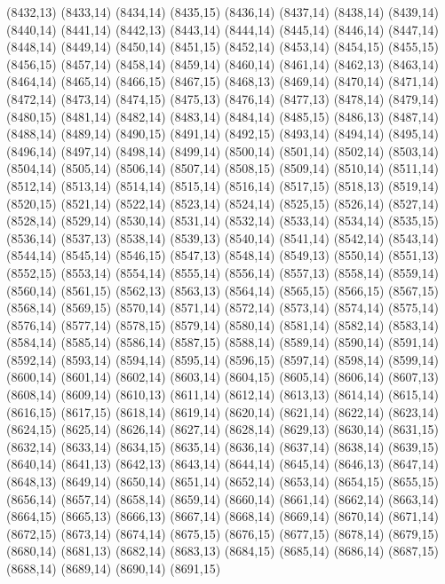 (8432,13)
(8433,14)
(8434,14)
(8435,15)
(8436,14)
(8437,14)
(8438,14)
(8439,14)
(8440,14)
(8441,14)
(8442,13)
(8443,14)
(8444,14)
(8445,14)
(8446,14)
(8447,14)
(8448,14)
(8449,14)
(8450,14)
(8451,15)
(8452,14)
(8453,14)
(8454,15)
(8455,15)
(8456,15)
(8457,14)
(8458,14)
(8459,14)
(8460,14)
(8461,14)
(8462,13)
(8463,14)
(8464,14)
(8465,14)
(8466,15)
(8467,15)
(8468,13)
(8469,14)
(8470,14)
(8471,14)
(8472,14)
(8473,14)
(8474,15)
(8475,13)
(8476,14)
(8477,13)
(8478,14)
(8479,14)
(8480,15)
(8481,14)
(8482,14)
(8483,14)
(8484,14)
(8485,15)
(8486,13)
(8487,14)
(8488,14)
(8489,14)
(8490,15)
(8491,14)
(8492,15)
(8493,14)
(8494,14)
(8495,14)
(8496,14)
(8497,14)
(8498,14)
(8499,14)
(8500,14)
(8501,14)
(8502,14)
(8503,14)
(8504,14)
(8505,14)
(8506,14)
(8507,14)
(8508,15)
(8509,14)
(8510,14)
(8511,14)
(8512,14)
(8513,14)
(8514,14)
(8515,14)
(8516,14)
(8517,15)
(8518,13)
(8519,14)
(8520,15)
(8521,14)
(8522,14)
(8523,14)
(8524,14)
(8525,15)
(8526,14)
(8527,14)
(8528,14)
(8529,14)
(8530,14)
(8531,14)
(8532,14)
(8533,14)
(8534,14)
(8535,15)
(8536,14)
(8537,13)
(8538,14)
(8539,13)
(8540,14)
(8541,14)
(8542,14)
(8543,14)
(8544,14)
(8545,14)
(8546,15)
(8547,13)
(8548,14)
(8549,13)
(8550,14)
(8551,13)
(8552,15)
(8553,14)
(8554,14)
(8555,14)
(8556,14)
(8557,13)
(8558,14)
(8559,14)
(8560,14)
(8561,15)
(8562,13)
(8563,13)
(8564,14)
(8565,15)
(8566,15)
(8567,15)
(8568,14)
(8569,15)
(8570,14)
(8571,14)
(8572,14)
(8573,14)
(8574,14)
(8575,14)
(8576,14)
(8577,14)
(8578,15)
(8579,14)
(8580,14)
(8581,14)
(8582,14)
(8583,14)
(8584,14)
(8585,14)
(8586,14)
(8587,15)
(8588,14)
(8589,14)
(8590,14)
(8591,14)
(8592,14)
(8593,14)
(8594,14)
(8595,14)
(8596,15)
(8597,14)
(8598,14)
(8599,14)
(8600,14)
(8601,14)
(8602,14)
(8603,14)
(8604,15)
(8605,14)
(8606,14)
(8607,13)
(8608,14)
(8609,14)
(8610,13)
(8611,14)
(8612,14)
(8613,13)
(8614,14)
(8615,14)
(8616,15)
(8617,15)
(8618,14)
(8619,14)
(8620,14)
(8621,14)
(8622,14)
(8623,14)
(8624,15)
(8625,14)
(8626,14)
(8627,14)
(8628,14)
(8629,13)
(8630,14)
(8631,15)
(8632,14)
(8633,14)
(8634,15)
(8635,14)
(8636,14)
(8637,14)
(8638,14)
(8639,15)
(8640,14)
(8641,13)
(8642,13)
(8643,14)
(8644,14)
(8645,14)
(8646,13)
(8647,14)
(8648,13)
(8649,14)
(8650,14)
(8651,14)
(8652,14)
(8653,14)
(8654,15)
(8655,15)
(8656,14)
(8657,14)
(8658,14)
(8659,14)
(8660,14)
(8661,14)
(8662,14)
(8663,14)
(8664,15)
(8665,13)
(8666,13)
(8667,14)
(8668,14)
(8669,14)
(8670,14)
(8671,14)
(8672,15)
(8673,14)
(8674,14)
(8675,15)
(8676,15)
(8677,15)
(8678,14)
(8679,15)
(8680,14)
(8681,13)
(8682,14)
(8683,13)
(8684,15)
(8685,14)
(8686,14)
(8687,15)
(8688,14)
(8689,14)
(8690,14)
(8691,15)
